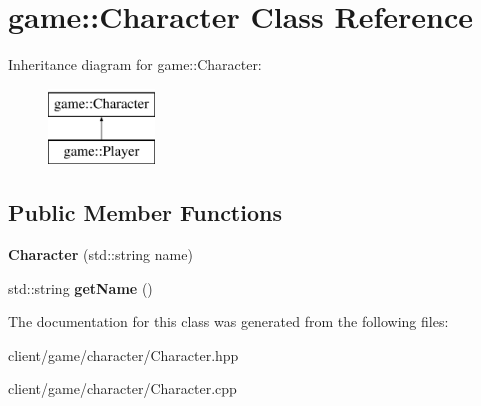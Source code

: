 \hypertarget{classgame_1_1_character}{\section{game\-:\-:Character Class Reference}
\label{classgame_1_1_character}
}
Inheritance diagram for game\-:\-:Character\-:\begin{figure}[H]
\begin{center}
\leavevmode
\includegraphics[height=2.000000cm]{classgame_1_1_character}
\end{center}
\end{figure}
\subsection*{Public Member Functions}
\begin{DoxyCompactItemize}
\item 
\hypertarget{classgame_1_1_character_a3e44ba36c26b07605340e6a9aecfeb44}{{\bfseries Character} (std\-::string name)}\label{classgame_1_1_character_a3e44ba36c26b07605340e6a9aecfeb44}

\item 
\hypertarget{classgame_1_1_character_ad32a3a673e344ec4398a32aea3d2e4ac}{std\-::string {\bfseries get\-Name} ()}\label{classgame_1_1_character_ad32a3a673e344ec4398a32aea3d2e4ac}

\end{DoxyCompactItemize}


The documentation for this class was generated from the following files\-:\begin{DoxyCompactItemize}
\item 
client/game/character/Character.\-hpp\item 
client/game/character/Character.\-cpp\end{DoxyCompactItemize}
